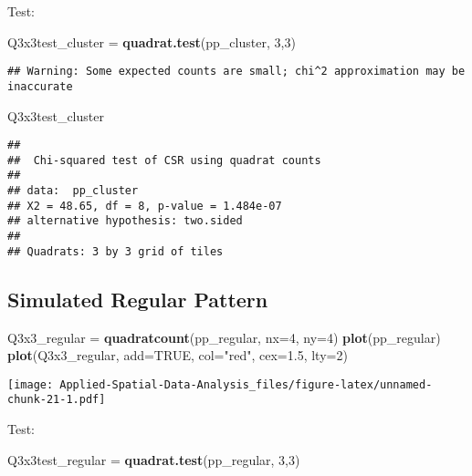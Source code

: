 \documentclass[
]{book}
\newenvironment{Shaded}{\begin{snugshade}}{\end{snugshade}}
\newcommand{\DataTypeTok}[1]{\textcolor[rgb]{0.13,0.29,0.53}{#1}}
\newcommand{\DecValTok}[1]{\textcolor[rgb]{0.00,0.00,0.81}{#1}}
\newcommand{\FloatTok}[1]{\textcolor[rgb]{0.00,0.00,0.81}{#1}}
\newcommand{\KeywordTok}[1]{\textcolor[rgb]{0.13,0.29,0.53}{\textbf{#1}}}
\newcommand{\NormalTok}[1]{#1}
\newcommand{\OtherTok}[1]{\textcolor[rgb]{0.56,0.35,0.01}{#1}}
\newcommand{\StringTok}[1]{\textcolor[rgb]{0.31,0.60,0.02}{#1}}
\begin{document}
Test:

\begin{Shaded}
\begin{Highlighting}[]
\NormalTok{Q3x3test_cluster =}\StringTok{ }\KeywordTok{quadrat.test}\NormalTok{(pp_cluster, }\DecValTok{3}\NormalTok{,}\DecValTok{3}\NormalTok{)}
\end{Highlighting}
\end{Shaded}

\begin{verbatim}
## Warning: Some expected counts are small; chi^2 approximation may be inaccurate
\end{verbatim}

\begin{Shaded}
\begin{Highlighting}[]
\NormalTok{Q3x3test_cluster}
\end{Highlighting}
\end{Shaded}

\begin{verbatim}
## 
## 	Chi-squared test of CSR using quadrat counts
## 
## data:  pp_cluster
## X2 = 48.65, df = 8, p-value = 1.484e-07
## alternative hypothesis: two.sided
## 
## Quadrats: 3 by 3 grid of tiles
\end{verbatim}

\hypertarget{simulated-regular-pattern}{%
\subsection{Simulated Regular Pattern}\label{simulated-regular-pattern}}

\begin{Shaded}
\begin{Highlighting}[]
\NormalTok{Q3x3_regular =}\StringTok{ }\KeywordTok{quadratcount}\NormalTok{(pp_regular, }\DataTypeTok{nx=}\DecValTok{4}\NormalTok{, }\DataTypeTok{ny=}\DecValTok{4}\NormalTok{)}
\KeywordTok{plot}\NormalTok{(pp_regular)}
\KeywordTok{plot}\NormalTok{(Q3x3_regular, }\DataTypeTok{add=}\OtherTok{TRUE}\NormalTok{, }\DataTypeTok{col=}\StringTok{"red"}\NormalTok{, }\DataTypeTok{cex=}\FloatTok{1.5}\NormalTok{, }\DataTypeTok{lty=}\DecValTok{2}\NormalTok{)}
\end{Highlighting}
\end{Shaded}

\texttt{[image: Applied-Spatial-Data-Analysis\_files/figure-latex/unnamed-chunk-21-1.pdf]}

Test:

\begin{Shaded}
\begin{Highlighting}[]
\NormalTok{Q3x3test_regular =}\StringTok{ }\KeywordTok{quadrat.test}\NormalTok{(pp_regular, }\DecValTok{3}\NormalTok{,}\DecValTok{3}\NormalTok{)}
\end{Highlighting}
\end{Shaded}
\end{document}
